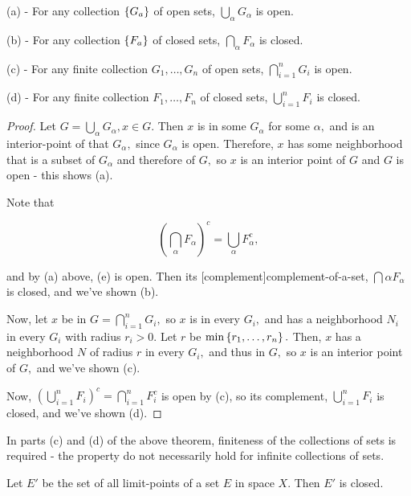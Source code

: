 \documentclass{article}
\begin{document}
\begin{theorem}\label{union-and-intersection-of-open-and-closed-sets}
(a) - For any \@{collection} $\left\{ G_a \right\}$ of \@{open} sets, $\bigcup_{\alpha} G_\alpha$ is open.

(b) - For any collection $\left\{ F_a \right\}$ of \@{closed} sets, $\bigcap_{\alpha} F_\alpha$ is closed.

(c) - For any \@{finite} collection $G_1,\dots,G_n$ of open sets, $\bigcap_{i=1}^n G_i$ is open.

(d) - For any finite collection $F_1,\dots,F_n$ of closed sets, $\bigcup_{i=1}^n F_i$ is closed.
\end{theorem}

\begin{proof}
Let $G = \bigcup_{\alpha} G_\alpha, x \in G.$ Then $x$ is in some $G_\alpha$ for some $\alpha,$ and is an \@{interior-point} of that $G_\alpha,$ since $G_\alpha$ is \@{open}. Therefore, $x$ has some \@{neighborhood} that is a \@{subset} of $G_\alpha$ and therefore of $G,$ so $x$ is an interior point of $G$ and $G$ is open - this shows (a).

Note that

\[ (\bigcap_{\alpha} F_\alpha)^c = \bigcup_{\alpha} F_\alpha^c, \tag{e} \]

and by (a) above, (e) is open. Then its \@[complement]{complement-of-a-set}, $\bigcap{\alpha} F_\alpha$ is \@{closed}, and we've shown (b).

Now, let $x$ be in $G = \bigcap_{i=1}^n G_i,$ so $x$ is in every $G_i,$ and has a neighborhood $N_i$ in every $G_i$ with radius $r_i > 0.$ Let $r$ be $\min\left\{ r_1, \dots, r_n \right\}.$ Then, $x$ has a neighborhood $N$ of radius $r$ in every $G_i,$ and thus in $G,$ so $x$ is an interior point of $G,$ and we've shown (c).

 Now, $(\bigcup_{i=1}^n F_i)^c = \bigcap_{i=1}^n F_i^c$ is open by (c), so its complement, $\bigcup_{i=1}^n F_i$ is closed, and we've shown (d).
\end{proof}

\begin{note}
In parts (c) and (d) of the above theorem, finiteness of the collections of sets is required - the property do not necessarily hold for infinite collections of sets.
\end{note}

\begin{theorem}\label{limit-points-form-closed-set}
Let $E'$ be the set of all \@{limit-points} of a set $E$ in space $X.$ Then $E'$ is \@{closed}.
\end{theorem}
\end{document}
